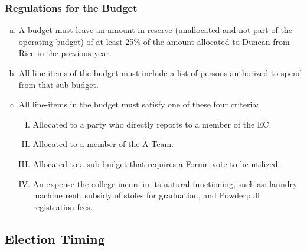 \documentclass[USletter,12pt]{article}
\begin{document}
\begin{enumerate}[(a)]
\subsubsection{Regulations for the Budget}
\begin{enumerate}[(a)]
\item A budget must leave an amount in reserve (unallocated and not part of the operating budget) of at least 25\% of the amount allocated to Duncan from Rice in the previous year.
\item All line-items of the budget must include a list of persons authorized to spend from that sub-budget.
\item All line-items in the budget must satisfy one of these four criteria:
	\begin{enumerate}[(I)]
	\item Allocated to a party who directly reports to a member of the EC.
	\item Allocated to a member of the A-Team.
	\item Allocated to a sub-budget that requires a Forum vote to be utilized.
	\item An expense the college incurs in its natural functioning, such as: laundry machine rent, subsidy of stoles for graduation, and Powderpuff registration fees.
	\end{enumerate}
\end{enumerate}


\subsection{Election Timing}



\end{enumerate}
\end{document}
